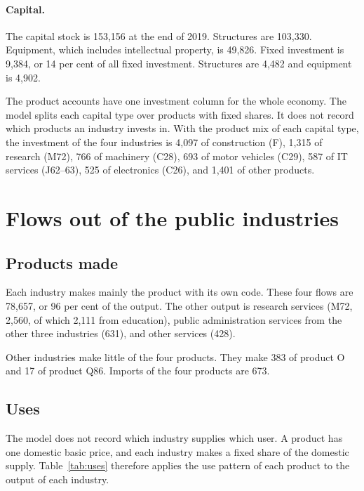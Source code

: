 \documentclass[11pt,a4paper]{article}
\begin{document}
\paragraph{Capital.}
The capital stock is 153,156 at the end of 2019. Structures are 103,330. Equipment, which includes intellectual property, is 49,826.
Fixed investment is 9,384, or 14 per cent of all fixed investment. Structures are 4,482 and equipment is 4,902.

The product accounts have one investment column for the whole economy. The model splits each capital type over products with fixed shares.
It does not record which products an industry invests in.
With the product mix of each capital type, the investment of the four industries is 4,097 of construction (F), 1,315 of research (M72), 766 of machinery (C28), 693 of motor vehicles (C29), 587 of IT services (J62--63), 525 of electronics (C26), and 1,401 of other products.

\section{Flows out of the public industries}

\subsection{Products made}

Each industry makes mainly the product with its own code. These four flows are 78,657, or 96 per cent of the output.
The other output is research services (M72, 2,560, of which 2,111 from education), public administration services from the other three industries (631), and other services (428).

Other industries make little of the four products. They make 383 of product O and 17 of product Q86.
Imports of the four products are 673.

\subsection{Uses}

The model does not record which industry supplies which user.
A product has one domestic basic price, and each industry makes a fixed share of the domestic supply.
Table~\ref{tab:uses} therefore applies the use pattern of each product to the output of each industry.
\end{document}
